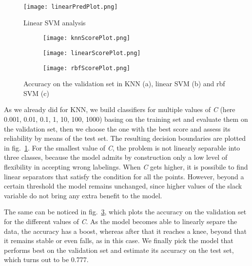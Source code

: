 \documentclass[11pt,twoside,a4paper]{article}
\begin{document}
\begin{figure}[!b]
  \begin{center}
  \texttt{[image: linearPredPlot.png]}
  \caption{Linear SVM analysis}
  \label{fig:linearPred}
  \end{center}
\end{figure}

\begin{figure}[]
    \centering
    \begin{subfigure}{0.7\textwidth}
	\texttt{[image: knnScorePlot.png]}
        \caption{}
        \label{fig:knnScore}
    \end{subfigure}
    \begin{subfigure}{0.7\textwidth}
	\texttt{[image: linearScorePlot.png]}
        \caption{}
        \label{fig:linearScore}
    \end{subfigure}
    \begin{subfigure}{0.7\textwidth}
        \texttt{[image: rbfScorePlot.png]}
        \caption{}
        \label{fig:rbfScore}
    \end{subfigure}%
    \caption{Accuracy on the validation set in KNN (a), linear SVM (b) and rbf SVM (c)}
\end{figure}

As we already did for KNN, we build classifiers for multiple values of \emph{C} (here 0.001, 0.01, 0.1, 1, 10, 100, 1000) basing on the training set and evaluate them on the validation set, then we choose the one with the best score and assess its reliability by means of the test set.\newline
The resulting decision boundaries are plotted in fig.~\ref{fig:linearPred}. For the smallest value of \emph{C}, the problem is not linearly separable into three classes, because the model admits by construction only a low level of flexibility in accepting wrong labelings. When \emph{C} gets higher, it is possibile to find linear separators that satisfy the condition for all the points. However, beyond a certain threshold the model remains unchanged, since higher values of the slack variable do not bring any extra benefit to the model. 

The same can be noticed in fig.~\ref{fig:linearScore}, which plots the accuracy on the validation set for the different values of \emph{C}. As the model becomes able to linearly separe the data, the accuracy has a boost, whereas after that it reaches a knee, beyond that it remains stable or even falls, as in this case. We finally pick the model that performs best on the validation set and estimate its accuracy on the test set, which turns out to be 0.777.
\end{document}
